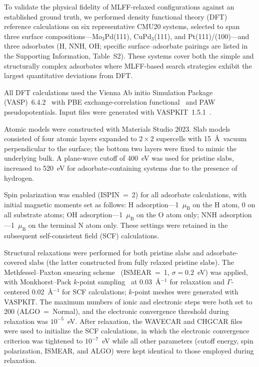 To validate the physical fidelity of MLFF-relaxed configurations against an established ground truth, we performed density functional theory (DFT) reference calculations on six representative CMU20 systems, selected to span three surface compositions---Mo$_3$Pd(111), CuPd$_3$(111), and Pt(111)/(100)---and three adsorbates (H, NNH, OH; specific surface--adsorbate pairings are listed in the Supporting Information, Table~S2). These systems cover both the simple and structurally complex adsorbates where MLFF-based search strategies exhibit the largest quantitative deviations from DFT.

All DFT calculations used the Vienna Ab initio Simulation Package (VASP)~6.4.2~\cite{kresse1996efficient,kresse1999ultrasoft} with PBE exchange-correlation functional~\cite{perdew1996generalized} and PAW pseudopotentials. Input files were generated with VASPKIT~1.5.1~\cite{wang2021vaspkit}.

Atomic models were constructed with Materials Studio 2023. Slab models consisted of four atomic layers expanded to $2\times2$ supercells with 15~\AA\ vacuum perpendicular to the surface; the bottom two layers were fixed to mimic the underlying bulk. A plane-wave cutoff of 400~eV was used for pristine slabs, increased to 520~eV for adsorbate-containing systems due to the presence of hydrogen.

Spin polarization was enabled (ISPIN~=~2) for all adsorbate calculations, with initial magnetic moments set as follows: H adsorption---1~$\mu_\mathrm{B}$ on the H atom, 0 on all substrate atoms; OH adsorption---1~$\mu_\mathrm{B}$ on the O atom only; NNH adsorption---1~$\mu_\mathrm{B}$ on the terminal N atom only. These settings were retained in the subsequent self-consistent field (SCF) calculations.

Structural relaxations were performed for both pristine slabs and adsorbate-covered slabs (the latter constructed from fully relaxed pristine slabs). The Methfessel--Paxton smearing scheme~\cite{methfessel1989high} (ISMEAR~=~1, $\sigma=0.2$~eV) was applied, with Monkhorst--Pack $k$-point sampling~\cite{monkhorst1976special} at 0.03~\AA$^{-1}$ for relaxation and $\Gamma$-centered 0.02~\AA$^{-1}$ for SCF calculations; $k$-point meshes were generated with VASPKIT. The maximum numbers of ionic and electronic steps were both set to 200 (ALGO~=~Normal), and the electronic convergence threshold during relaxation was $10^{-5}$~eV. After relaxation, the WAVECAR and CHGCAR files were used to initialize the SCF calculations, in which the electronic convergence criterion was tightened to $10^{-7}$~eV while all other parameters (cutoff energy, spin polarization, ISMEAR, and ALGO) were kept identical to those employed during relaxation.

